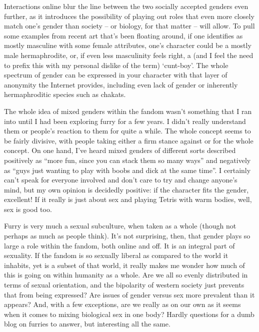 Interactions online blur the line between the two socially accepted genders even further, as it introduces the possibility of playing out roles that even more closely match one's gender than society -- or biology, for that matter -- will allow.  To pull some examples from recent art that's been floating around, if one identifies as mostly masculine with some female attributes, one's character could be a mostly male hermaphrodite, or, if even less masculinity feels right, a (and I feel the need to prefix this with my personal dislike of the term) `cunt-boy'.  The whole spectrum of gender can be expressed in your character with that layer of anonymity the Internet provides, including even lack of gender or inherently hermaphroditic species such as chakats.

The whole idea of mixed genders within the fandom wasn't something that I ran into until I had been exploring furry for a few years.  I didn't really understand them or people's reaction to them for quite a while.  The whole concept seems to be fairly divisive, with people taking either a firm stance against or for the whole concept.  On one hand, I've heard mixed genders of different sorts described positively as ``more fun, since you can stack them so many ways'' and negatively as ``guys just wanting to play with boobs and dick at the same time''.  I certainly can't speak for everyone involved and don't care to try and change anyone's mind, but my own opinion is decidedly positive: if the character fits the gender, excellent!  If it really is just about sex and playing Tetris with warm bodies, well, sex is good too.

Furry is very much a sexual subculture, when taken as a whole (though not perhaps as much as people think).  It's not surprising, then, that gender plays so large a role within the fandom, both online and off.  It is an integral part of sexuality.  If the fandom is so sexually liberal as compared to the world it inhabits, yet is a subset of that world, it really makes me wonder how much of this is going on within humanity as a whole.  Are we all so evenly distributed in terms of sexual orientation, and the bipolarity of western society just prevents that from being expressed?  Are issues of gender versus sex more prevalent than it appears?  And, with a few exceptions, are we really as on our own as it seems when it comes to mixing biological sex in one body?  Hardly questions for a dumb blog on furries to answer, but interesting all the same.
